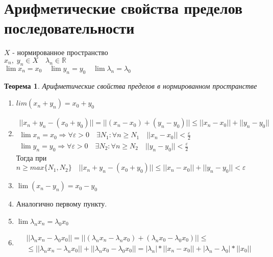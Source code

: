 \documentclass[12pt,letterpaper]{report}
\makeatletter
\newtheorem*{theorem-non}{Теорема}
\theoremstyle{definition}
\renewenvironment{proof}[1][\proofname]{%
   \par\pushQED{\qed}\normalfont%
   \topsep6\p@\@plus6\p@\relax
   \trivlist\item[\hskip\labelsep\bfseries#1\@addpunct{.}]%
   \ignorespaces
}{%
   \popQED\endtrivlist\@endpefalse
}
\makeatother
\begin{document}
    \section{Арифметические свойства пределов последовательности}
    $X$ - нормированное пространство \\
    $x_n,\; y_n \in X \quad \lambda_n \in \mathbb{R}$ \\
    $\lim x_n = x_0 \quad \lim y_n = y_0 \quad \lim \lambda_n = \lambda_0$ 
    \begin{theorem-non} Арифметические свойства пределов в нормированном пространстве \end{theorem-non}
    \begin{enumerate}
        \item $lim (x_n + y_n) = x_0 + y_0$
        \begin{proof}
                \begin{gather*}
                    ||x_n + y_n - (x_0 + y_0) || = || (x_n - x_0) + (y_n - y_0)|| \leqslant ||x_n - x_0|| + ||y_n - y_0|| \\
                    \lim x_n = x_0 \Rightarrow \forall \varepsilon > 0 \quad \exists N_1 : \forall n \geqslant N_1 \quad ||x_n - x_0|| < \frac{\varepsilon}{2} \\
                    \lim y_n = y_0 \Rightarrow \forall \varepsilon > 0 \quad \exists N_2 : \forall n \geqslant N_2 \quad ||y_n - y_0|| < \frac{\varepsilon}{2} 
                \end{gather*}
                Тогда при $n \geqslant max\{N_1, N_2\} \quad ||x_n + y_n - (x_0 + y_0)|| \leqslant ||x_n - x_0|| + ||y_n - y_0|| < \varepsilon$
        \end{proof}
        \item $\lim (x_n - y_n) = x_0 - y_0$
        \begin{proof}
                Аналогично первому пункту.
        \end{proof}
        \item $\lim \lambda_nx_n = \lambda_0x_0$
        \begin{proof}
                \begin{gather*}
                || \lambda_nx_n - \lambda_0x_0 || = ||(\lambda_nx_n - \lambda_nx_0) + (\lambda_nx_0 - \lambda_0x_0)|| \leqslant \\
                \leqslant ||\lambda_nx_n - \lambda_nx_0|| + ||\lambda_nx_0 - \lambda_0x_0|| = |\lambda_n|*||x_n - x_0|| + |\lambda_n - \lambda_0|*||x_0||
                \end{gather*} 

\end{proof}
\end{enumerate}
\end{document}
